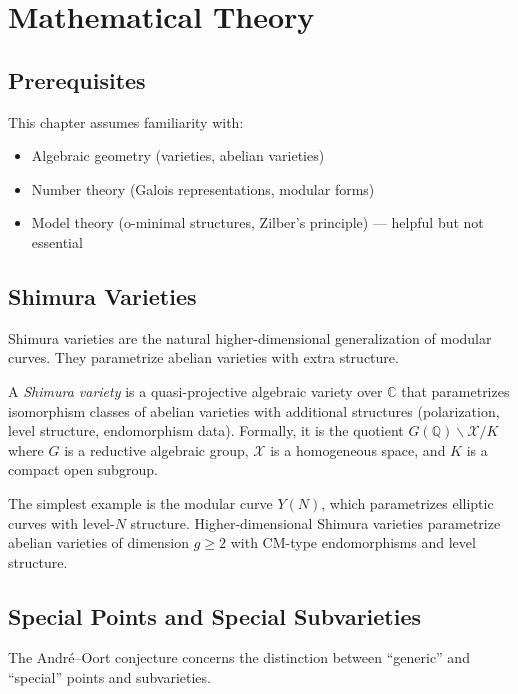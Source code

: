 \section{Mathematical Theory}

\subsection{Prerequisites}
This chapter assumes familiarity with:
\begin{itemize}
\item Algebraic geometry (varieties, abelian varieties)
\item Number theory (Galois representations, modular forms)
\item Model theory (o-minimal structures, Zilber's principle) --- helpful but not essential
\end{itemize}

\subsection{Shimura Varieties}

Shimura varieties are the natural higher-dimensional generalization of modular curves. They parametrize abelian varieties with extra structure.

\begin{definition}
A \emph{Shimura variety} is a quasi-projective algebraic variety over $\mathbb{C}$ that parametrizes isomorphism classes of abelian varieties with additional structures (polarization, level structure, endomorphism data). Formally, it is the quotient $G(\mathbb{Q}) \backslash \mathcal{X} / K$ where $G$ is a reductive algebraic group, $\mathcal{X}$ is a homogeneous space, and $K$ is a compact open subgroup.
\end{definition}

The simplest example is the modular curve $Y(N)$, which parametrizes elliptic curves with level-$N$ structure. Higher-dimensional Shimura varieties parametrize abelian varieties of dimension $g \ge 2$ with CM-type endomorphisms and level structure.

\subsection{Special Points and Special Subvarieties}

The André--Oort conjecture concerns the distinction between ``generic'' and ``special'' points and subvarieties.

